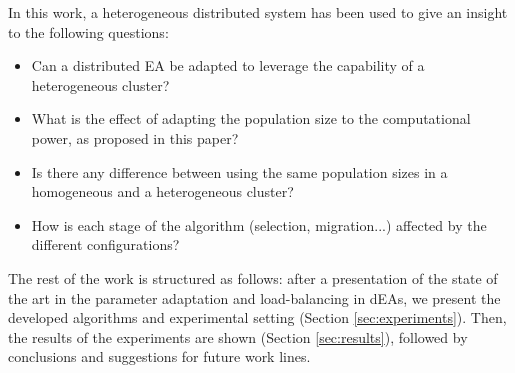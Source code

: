 \documentclass[final,1p,times]{elsarticle}
\begin{document}


In this work, a heterogeneous distributed system has been used to give an insight to the following questions:
\begin{itemize}
 \item Can a distributed EA be adapted to leverage the capability of a heterogeneous cluster?
 \item What is the effect of adapting the population size to the computational power, as proposed in this paper? %
 \item Is there any difference between using the same population sizes in a homogeneous and a heterogeneous cluster?
 \item How is each stage of the algorithm (selection, migration...) affected by the different
   configurations? %
\end{itemize}


The rest of the work is structured as follows: after a presentation of
the state of
the art in the parameter adaptation and load-balancing in dEAs, %
 we present the developed algorithms and experimental setting (Section \ref{sec:experiments}). 
Then, the results of the experiments are shown (Section \ref{sec:results}), followed by conclusions and suggestions for future work lines.
\end{document}

